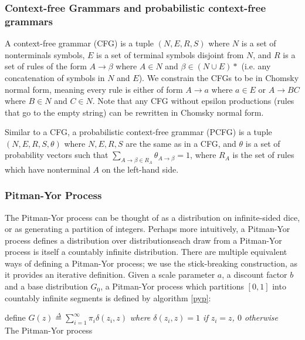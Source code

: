 \documentclass[12pt,letterpaper]{article}
\begin{document}
\subsubsection{Context-free Grammars and probabilistic context-free grammars}
A context-free grammar (CFG) is a tuple $(N, E, R, S)$ where $N$ is a set of nonterminals symbols, $E$ is a set of terminal symbols disjoint from $N$, and $R$ is a set of rules of the form $A \rightarrow \beta$ where $A \in N$ and $\beta \in (N \cup E)*$ (i.e. any concatenation of symbols in $N$ and $E$). We constrain the CFGs to be in Chomsky normal form, meaning every rule is either of form $A \rightarrow a$ where $a \in E$ or $A \rightarrow BC$ where $B\in N$ and $C\in N$. Note that any CFG without epsilon productions (rules that go to the empty string) can be rewritten in Chomsky normal form. \citep{hopcroft:2006}  

Similar to a CFG, a probabilistic context-free grammar (PCFG) is a tuple $(N, E, R, S, \theta)$ where $N,E,R,S$ are the same as in a CFG, and $\theta$ is a set of probability vectors such that $\sum\limits_{A\rightarrow \beta \in R_A} \theta_{A\rightarrow \beta} = 1$, where $R_A$ is the set of rules which have nonterminal $A$ on the left-hand side. 

\subsubsection{Pitman-Yor Process}
The Pitman-Yor process \citep{pitman:1997} can be thought of as a distribution on infinite-sided dice, or as generating a partition of integers. Perhaps more intuitively, a Pitman-Yor process defines a distribution over distributions\textemdash each draw from a Pitman-Yor process is itself a countably infinite distribution. There are multiple equivalent ways of defining a Pitman-Yor process; we use the stick-breaking construction, as it provides an iterative definition. Given a scale parameter $a$, a discount factor $b$ and a base distribution $G_0$, a Pitman-Yor process which partitions $[0,1]$ into countably infinite segments is defined by algorithm \hyperref[pyp]{\ref*{pyp}}:\\

\begin{algorithm}[H]
define $G(z) \overset{\Delta}{=} \sum\limits_{i=1}^\infty \pi_i \delta(z_i, z)$ \emph{where $\delta(z_i,z) = 1$ if $z_i = z$, $0$ otherwise}\\
\caption{The Pitman-Yor process}
\label{pyp}
\end{algorithm} \citep{sethuraman:1994}
\end{document}
